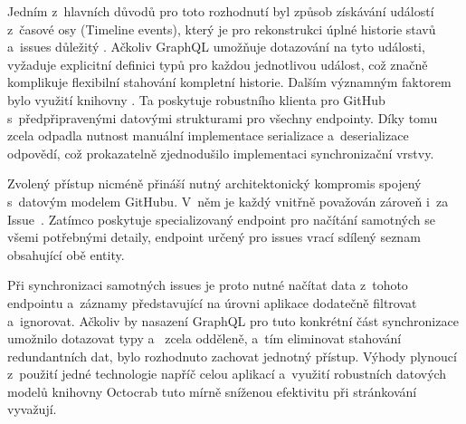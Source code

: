 Jedním z~hlavních důvodů pro toto rozhodnutí byl způsob získávání událostí z~časové osy (Timeline events), který je pro rekonstrukci úplné historie stavů \PR a~issues důležitý . Ačkoliv GraphQL umožňuje dotazování na tyto události, vyžaduje explicitní definici typů pro každou jednotlivou událost, což značně komplikuje flexibilní stahování kompletní historie. Dalším významným faktorem bylo využití knihovny . Ta poskytuje robustního \REST klienta pro GitHub s~předpřipravenými datovými strukturami pro všechny endpointy. Díky tomu zcela odpadla nutnost manuální implementace serializace a~deserializace \JSON odpovědí, což prokazatelně zjednodušilo implementaci synchronizační vrstvy.

Zvolený přístup nicméně přináší nutný architektonický kompromis spojený s~datovým modelem GitHubu. V~něm je každý \PR vnitřně považován zároveň i~za Issue~\cite{github_rest_api}. Zatímco \REST \API poskytuje specializovaný endpoint pro načítání samotných \PR se všemi potřebnými detaily, endpoint určený pro issues vrací sdílený seznam obsahující obě entity.

Při synchronizaci samotných issues je proto nutné načítat data z~tohoto endpointu a~záznamy představující \PR na úrovni aplikace dodatečně filtrovat a~ignorovat. Ačkoliv by nasazení GraphQL \API pro tuto konkrétní část synchronizace umožnilo dotazovat typy  a~ zcela odděleně, a~tím eliminovat stahování redundantních dat, bylo rozhodnuto zachovat jednotný přístup. Výhody plynoucí z~použití jedné technologie napříč celou aplikací a~využití robustních datových modelů knihovny Octocrab tuto mírně sníženou efektivitu při stránkování vyvažují.
